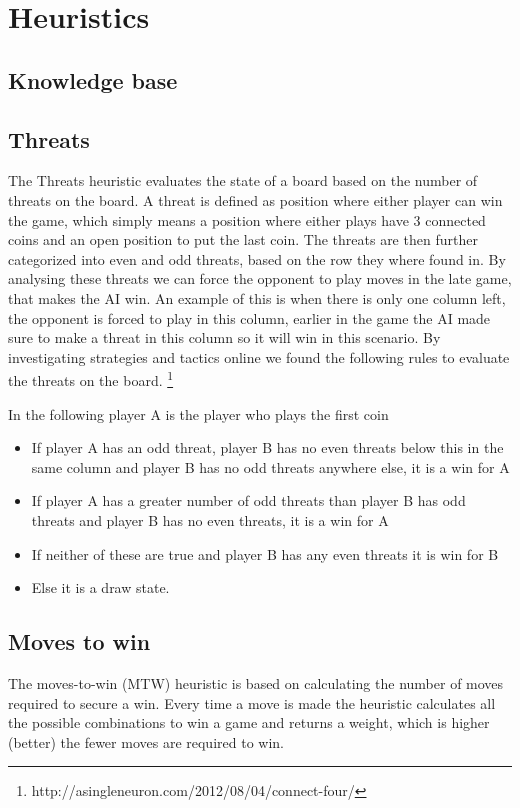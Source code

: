 \documentclass[a4paper, titlepage]{article}
\begin{document}
\section*{Heuristics}
\subsection*{Knowledge base}


\subsection*{Threats}
The Threats heuristic evaluates the state of a board based on the number of
threats on the board. A threat is defined as position where either player can
win the game, which simply means a position where either plays have 3 connected
coins and an open position to put the last coin. The threats are then further
categorized into even and odd threats, based on the row they where found in. By
analysing these threats we can force the opponent to play moves in the late
game, that makes the AI win. An example of this is when there is only one column
left, the opponent is forced to play in this column, earlier in the game the AI
made sure to make a threat in this column so it will win in this scenario. By
investigating strategies and tactics online we found the following rules to
evaluate the threats on the board.
\footnote{http://asingleneuron.com/2012/08/04/connect-four/}

In the following player A is the player who plays the first coin
\begin{itemize} 
	\item If player A has an odd threat, player B has no even threats below this in the same column and player B has no odd threats anywhere else, it is a win for A
	\item If player A has a greater number of odd threats than player B has odd threats and player B has no even threats, it is a win for A	
	\item If neither of these are true and player B has any even threats it is win for B
	\item Else it is a draw state.
\end{itemize} 

\subsection*{Moves to win}
The moves-to-win (MTW) heuristic is based on calculating the number of moves required to 
secure a win. Every time a move is made the heuristic calculates all the possible 
combinations to win a game and returns a weight, which is higher (better) the fewer
moves are required to win. 
\end{document}
